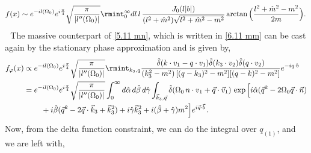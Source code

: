 \begin{align}
    \begin{split}
    f(x)\sim e^{-il(\Omega_0)}e^{i\frac{\pi}{4}}\sqrt{\frac{\pi}{|l''(\Omega_0)|}} \rmint_0^\infty dl\,l\,\frac{J_{0}(l|b|)}{(l^2+\hat{m}^2)\sqrt{l^2+\hat{m}^2-m^2}}\arctan\Big(\frac{l^2+\hat{m}^2-m^2}{2m}\Big).\,
    \end{split}
\end{align}
\textbullet $\,\,$ The massive counterpart of \eqref{5.11 mn}, which is written in \eqref{6.11 mm} can be cast again by the stationary phase approximation and is given by,
\begin{align}
    \begin{split}
        f_{\varphi}(x)&\propto e^{-il(\Omega_0)}e^{i\frac{\pi}{4}}\sqrt{\frac{\pi}{|l''(\Omega_0)|}}\rmint_{k_3,q} \frac{\hat\delta(k\cdot v_1-q\cdot v_1)\hat\delta(k_3\cdot v_2)\hat\delta(q\cdot v_2)}{(k_3^2-m^2) \, [(q-k_3)^2-m^2][(q-k)^2-m^2]}e^{-i q\cdot b}\\ &
        = e^{-il(\Omega_0)}e^{i\frac{\pi}{4}}\sqrt{\frac{\pi}{|l''(\Omega_0)|}}\int_0^\infty d\hat\alpha\,d\hat\beta\,d\hat\gamma\int_{\vec k_3,\vec q}\hat\delta(\Omega_0\,n\cdot v_1+\vec q\cdot \vec v_1)\,\exp\Big[i\hat\alpha(\vec q^2-2\Omega_0 \vec q\cdot \vec n)\\ &
\hspace{0.8cm}+i\hat\beta (\vec q^2-2\vec q\cdot \vec k_3+\vec k_3^2)+{i\hat\gamma \vec k_3^2}+i(\hat\beta+\hat\gamma)m^2\Big]e^{i\vec q\cdot \vec b}\,.
    \end{split}
\end{align}
Now, from the delta function constraint, we can do the integral over $q_{(1)}$, and we are left with,
